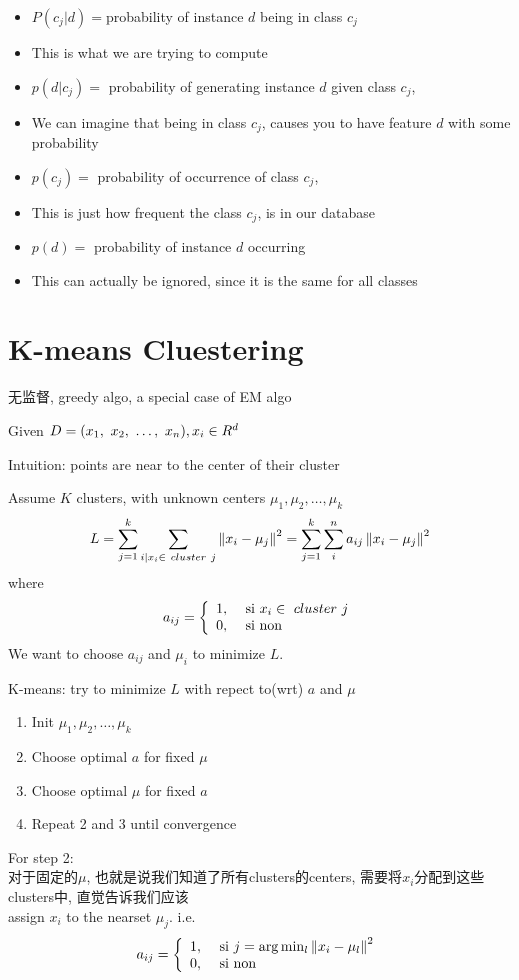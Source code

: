 \documentclass{article}
\begin{document}
\begin{itemize}
\item $P(c_j|d) = $probability of instance $d$ being in class $c_j$
\item [] This is what we are trying to compute
\item $p(d | c_j) =$ probability of generating instance $d$ given class $c_j$,
\item [] We can imagine that being in class $c_j$, causes you to have feature $d$ with some probability 
\item $p(c_j) =$ probability of occurrence of class $c_j$, 
\item [] This is just how frequent the class $c_j$, is in our database
\item $p(d) =$ probability of instance $d$ occurring
\item [] This can actually be ignored, since it is the same for all classes
\end{itemize}

\section{K-means Cluestering}
无监督, greedy algo, a special case of EM algo

Given $D = (x_1,~x_2,~\ldots,~x_n), x_i \in R^d$

Intuition: points are near to the center of their cluster

Assume $K$ clusters, with unknown centers $\mu_1, \mu_2, \ldots, \mu_k$
$$
L
= \sum_{j = 1}^k \sum_{i | x_i \in\ cluster\ j}\left\Vert x_i - \mu_j\right\Vert^2
= \sum_{j = 1}^k \sum_i^n a_{ij}\left\Vert x_i - \mu_j\right\Vert^2
$$
where
$$
a_{ij} =
\left\{
  \begin{array}{ll}
    1, & \textrm{\ si } x_i \in\ cluster\ j\\
    0, & \textrm{ si non}
  \end{array}
\right.
$$
We want to choose $a_{ij}$ and $\mu_i$ to minimize $L$.

K-means: try to minimize $L$ with repect to(wrt) $a$ and $\mu$
\begin{enumerate}
\item Init $\mu_1, \mu_2, \ldots, \mu_k$
\item Choose optimal $a$ for fixed $\mu$
\item Choose optimal $\mu$ for fixed $a$
\item Repeat 2 and 3 until convergence
\end{enumerate}

For step 2:\\
对于固定的$\mu$, 也就是说我们知道了所有clusters的centers, 需要将$x_i$分配到这些clusters中, 直觉告诉我们应该\\
assign $x_i$ to the nearset $\mu_j$. i.e.
$$
a_{ij} =
\left\{
  \begin{array}{ll}
  1, & \textrm{\ si } j = \arg \min_l \left\Vert x_i - \mu_l\right\Vert^2\\
    0, & \textrm{ si non}
  \end{array}
\right.
$$
\end{document}
